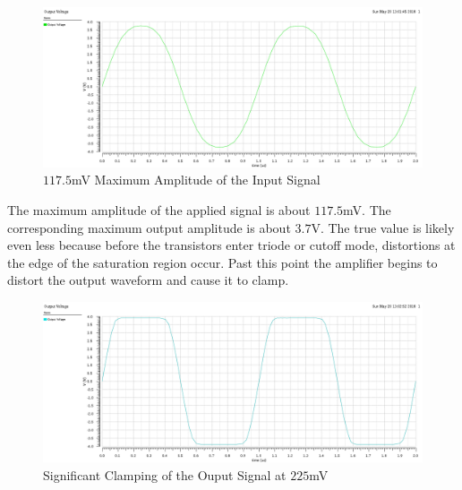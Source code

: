 \FloatBarrier

\begin{figure}[h!]
	\centering
	\includegraphics[scale=0.75]{../images/sim4_max_sin.PNG}
	\caption{$117.5$\si{\milli\volt} Maximum Amplitude of the Input Signal}
	\label{fig:sim4_max_sin}
\end{figure}

\FloatBarrier

The maximum amplitude of the applied signal is about $117.5$\si{\milli\volt}.
The corresponding maximum output amplitude is about $3.7$\si{\volt}.
The true value is likely even less because before the transistors enter triode or cutoff mode, distortions at the edge of the saturation region occur.
Past this point the amplifier begins to distort the output waveform and cause it to clamp.

\FloatBarrier

\begin{figure}[h!]
	\centering
	\includegraphics[scale=0.75]{../images/sim4_past_max.PNG}
	\caption{Significant Clamping of the Ouput Signal at $225$\si{\milli\volt}}
	\label{fig:sim4_past_max}
\end{figure}

\FloatBarrier
